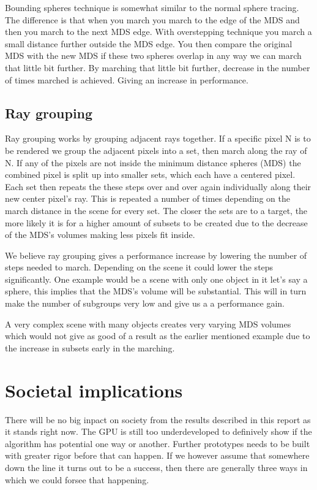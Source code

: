 			Bounding spheres technique is somewhat similar to the normal sphere
			tracing. The difference is that when you march you march to the
			edge of the MDS and then you march to the next MDS edge. With
			overstepping technique you march a small distance further outside
			the MDS edge. You then compare the original MDS with the new MDS if
			these two spheres overlap in any way we can march that little bit
			further. By marching that little bit further, decrease in the
			number of times marched is achieved. Giving an increase in
			performance. 

		\subsection{Ray grouping}
		
			Ray grouping works by grouping adjacent rays together. If a specific 
			pixel N is to be rendered we group the adjacent pixels into a set, 
			then march along the ray of N. If any of the pixels are not inside 
			the minimum distance spheres (MDS) the combined pixel is split up 
			into smaller sets, which each have a centered pixel. Each set then 
			repeats the these steps over and over again individually along their 
			new center pixel's ray.  This is repeated a number of times 
			depending on the march distance in the scene for every set. The 
			closer the sets are to a target, the more likely it is for a higher 
			amount of subsets to be created due to the decrease of the MDS's 
			volumes making less pixels fit inside.
			
			We believe ray grouping gives a performance increase by lowering
			the number of steps needed to march. Depending on the scene it
			could lower the steps significantly. One example would be a scene
			with only one object in it let's say a sphere, this implies that
			the MDS's volume will be substantial. This will in turn make the
			number of subgroups very low and give us a a performance gain. 
			
			A very complex scene with many objects creates very varying MDS
			volumes which would not give as good of a result as the earlier
			mentioned example due to the increase in subsets early in the
			marching.

	\section{Societal implications}

		There will be no big inpact on society from the results described in this
		report as it stands right now. The GPU is still too underdeveloped to
		definively show if the algorithm has potential one way or another. Further
		prototypes needs to be built with greater rigor before that can happen.  If
		we however assume that somewhere down the line it turns out to be a
		success, then there are generally three ways in which we could forsee that
		happening.

